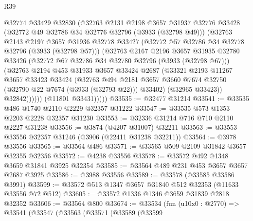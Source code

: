 \begin{lexlean}{R39}
\begin{coremodule}
                @32774
                @33429
                @32830
                (@32763
                  @2131
                  @2198
                  @3657
                  @31937
                  @32776
                  @33428
                  (@32772 @49 @32786 @34 @32776 @32796 (@3933 (@32798 @49)))
                  (@32763
                    @2143
                    @2197
                    @3657
                    @31936
                    @32778
                    @33427
                    (@32772 @57 @32786 @34 @32778 @32796 (@3933 (@32798 @57)))
                    (@32763
                      @2167
                      @2196
                      @3657
                      @31935
                      @32780
                      @33426
                      (@32772 @67 @32786 @34 @32780 @32796 (@3933 (@32798 @67)))
                      (@32763
                        @2194
                        @453
                        @31933
                        @3657
                        @33424
                        @2687
                        (@33321
                          @2193
                          @11267
                          @3657
                          @33423
                          @33424
                          (@32763
                            @494
                            @2181
                            @3657
                            @3660
                            @7674
                            @32750
                            (@32790 @22 @7674 (@3933 (@32793 @22)))
                            @33402)
                          (@32965 @33423))
                        @32842))))))
            (@11801 @33431)))))
@33535 := @32477 @31214
@33541 := @33535 @486 @1740 @2110 @2229 @32357 @31222
@33547 := @33535 @573 @1353 @2203 @2228 @32357 @31230
@33553 := @32336 @31214 @716 @710 @2110 @2227 @31238
@33556 := @3874 (@4207 @31007) @32211
@33563 := @33553 @33556 @32357 @31246 (@3906 (@22411 @31238 @32211))
@33564 := @3978 @33556
@33565 := @33564 @486
@33571 := @33565 @509 @2109 @31842 @3657 @32355 @32356
@33572 := @4238 @33556
@33578 := @33572 @492 @1348 @3659 @31841 @3925 @32354
@33585 := @33564 @489 @231 @453 @3657 @3657 @2687 @3925
@33586 := @3988 @33556
@33589 := @33578 (@33585 @33586 @3991)
@33599 := @33572 @513 @1347 @3657 @31840 @512 @32353 (@11633 @33556 @72 @512)
@33605 := @33572 @1336 @1346 @3659 @31839 @2818 @32352
@33606 := @33564 @800
@33674 := @33534
    (fun (u10x0 : @2770) =>
    @33541
      (@33547
        (@33563
          (@33571
            (@33589
              (@33599

\end{coremodule}
\end{lexlean}
